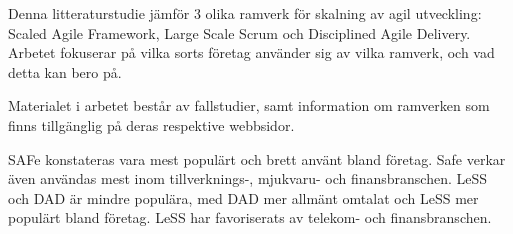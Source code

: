 %
%




\begin{svabstract}

Denna litteraturstudie jämför 3 olika ramverk för skalning av agil utveckling: Scaled Agile Framework, Large Scale Scrum och Disciplined Agile Delivery. Arbetet fokuserar på vilka sorts företag använder sig av vilka ramverk, och vad detta kan bero på.

Materialet i arbetet består av fallstudier, samt information om ramverken som finns tillgänglig på deras respektive webbsidor. 

SAFe konstateras vara mest populärt och brett använt bland företag. Safe verkar även användas mest inom tillverknings-, mjukvaru- och finansbranschen.
LeSS och DAD är mindre populära, med DAD mer allmänt omtalat och LeSS mer populärt bland företag. 
LeSS har favoriserats av telekom- och finansbranschen.




\end{svabstract}

